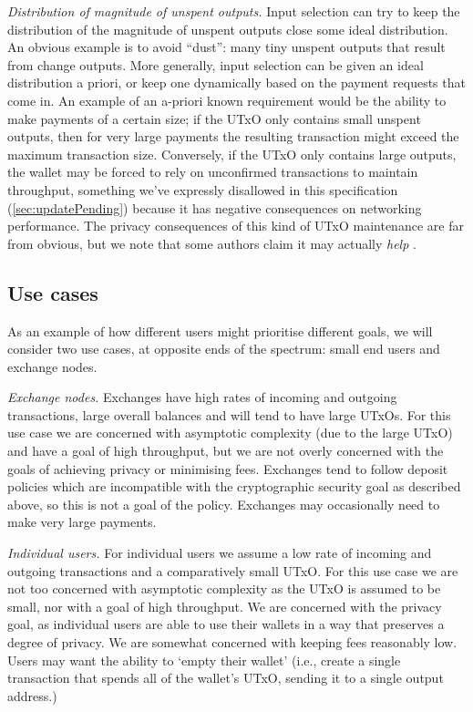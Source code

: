 \documentclass{article}
\theoremstyle{definition}{
  \newtheorem{lemma}{Lemma}[section] %
  \newtheorem{definition}[lemma]{Definition}
}
\theoremstyle{theorem}{
  \newtheorem{invariant}[lemma]{Invariant}
  \newtheorem{proofobligation}[lemma]{Proof Obligation}
}
\numberwithin{equation}{lemma}
\begin{document}
\emph{Distribution of magnitude of unspent outputs.}
Input selection can try to keep the distribution of the magnitude of unspent
outputs close some ideal distribution. An obvious example is to avoid ``dust'':
many tiny unspent outputs that result from change outputs. More generally,
input selection can be given an ideal distribution a priori, or keep one
dynamically based on the payment requests that come in. An example of an
a-priori known requirement would be the ability to make payments of a certain
size; if the UTxO only contains small unspent outputs, then for very large
payments the resulting transaction might exceed the maximum transaction size.
Conversely, if the UTxO only contains large outputs, the wallet may be forced to
rely on unconfirmed transactions to maintain throughput, something we've
expressly disallowed in this specification (\cref{sec:updatePending})
because it has negative consequences on networking performance.
The privacy consequences of this kind of UTxO maintenance are far from obvious,
but we note that some authors claim it may actually \emph{help}
\citep[Section 2]{10.1007/978-3-642-39884-1_2}.

\subsection{Use cases}
\label{sec:input_selection_use_cases}

As an example of how different users might prioritise different goals,
we will consider two use cases, at opposite ends of the spectrum: small end
users and exchange nodes.

\emph{Exchange nodes.}
Exchanges have high rates of incoming and outgoing transactions, large overall
balances and will tend to have large UTxOs. For this use case we are concerned
with asymptotic complexity (due to the large UTxO) and have a goal of high
throughput, but we are not overly concerned with the goals of achieving privacy
or minimising fees. Exchanges tend to follow deposit policies which are
incompatible with the cryptographic security goal as described above, so this is
not a goal of the policy. Exchanges may occasionally need to make very large
payments.

\emph{Individual users.}
For individual users we assume a low rate of incoming and outgoing transactions
and a comparatively small UTxO. For this use case we are not too concerned with
asymptotic complexity as the UTxO is assumed to be small, nor with a goal of
high throughput. We are concerned with the privacy goal, as individual users
are able to use their wallets in a way that preserves a degree of privacy. We
are somewhat concerned with keeping fees reasonably low. Users may want the
ability to `empty their wallet' (i.e., create a single transaction that
spends all of the wallet's UTxO, sending it to a single output address.)
\end{document}
